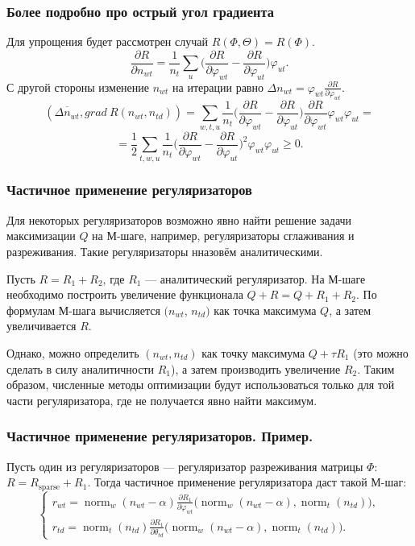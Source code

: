 \documentclass[utf8]{beamer}
\DeclareMathOperator{\norm}{norm}
\renewcommand{\geq}{\geqslant}
\renewcommand{\phi}{\varphi}
\begin{document}
\begin{frame}
\frametitle{Более подробно про острый угол градиента}

Для упрощения будет рассмотрен случай $R(\Phi, \Theta) = R(\Phi)$.
\[
\frac{\partial{R}}{\partial{n_{wt}}}  = \frac{1}{n_t} \sum_{u} \bigg(\frac{\partial{R}}{\partial{\phi_{wt}}}  -  \frac{\partial{R}}{\partial{\phi_{ut}}} \bigg)  \phi_{ut}.
\]
С другой стороны изменение $n_{wt}$ на итерации равно $ \Delta n_{wt} =  \phi_{wt} \frac{\partial{R}}{\partial{\phi_{wt}}}$.
\[
(\overline{\Delta n_{wt}}, grad\ R(n_{wt}, n_{td})) = \sum\limits_{w, t, u}  \frac{1}{n_{t}}  \bigg(  \frac{\partial{R}}{\partial{\phi_{wt}}}  -  \frac{\partial{R}}{\partial{\phi_{ut}}}  \bigg)  \frac{\partial{R}}{\partial{\phi_{wt}}} \phi_{wt} \phi_{ut}  = 
\]
\[
= \frac12  \sum\limits_{t, w, u}  \frac{1}{n_{t}} \bigg(  \frac{\partial{R}}{\partial{\phi_{wt}}}  -  \frac{\partial{R}}{\partial{\phi_{ut}}}  \bigg)^2 \phi_{wt} \phi_{ut}  \geq 0.
\]
\end{frame}

\begin{frame}
\frametitle{Частичное применение регуляризаторов}
Для некоторых регуляризаторов возможно явно найти решение  задачи  максимизации  $Q$ на М-шаге, например, регуляризаторы сглаживания и разреживания. Такие регуляризаторы нназовём аналитическими.
\medskip

Пусть $R = R_1 + R_2$, где $R_1$ --- аналитический регуляризатор. На М-шаге необходимо построить увеличение функционала $Q + R = Q + R_1 + R_2$. По формулам М-шага вычисляется $(n_{wt}$, $n_{td})$ как точка максимума $Q$, а затем увеличивается $R$.  
\medskip

Однако, можно определить $(n_{wt},n_{td})$ как точку максимума $Q + \tau R_1 $ (это можно сделать в силу аналитичности $R_1$), а затем производить увеличение $R_2$. Таким образом,  численные методы оптимизации будут использоваться только для той части регуляризатора, где не получается явно найти максимум.
\end{frame}

\begin{frame}
\frametitle{Частичное применение регуляризаторов. Пример.}
Пусть один из регуляризаторов --- регуляризатор разреживания матрицы $\Phi$: $R = R_{\text{sparse}} + R_1$. Тогда частичное применение регуляризатора даст такой М-шаг:
\[
\left\{
	\begin{aligned}
		r_{wt} = \norm_w(n_{wt} - \alpha) \frac{\partial{R_1}}{\partial{\phi_{wt}}} \bigg( \norm_w(n_{wt} - \alpha),\norm_t(n_{td})\bigg),\\
		r_{td} = \norm_t(n_{td}) \frac{\partial{R_1}}{\partial{\theta_{td}}} \bigg(\norm_w(n_{wt} - \alpha), \norm_t(n_{td})\bigg).
	\end{aligned}
\right.
\]
\end{frame}
\end{document}
